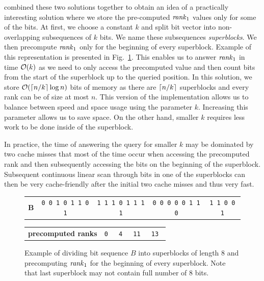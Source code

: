\cite{gonzalez2005practical} combined these two solutions together to obtain an idea of a practically
interesting solution where we store the pre-computed $\mathit{rank}_1$ values only for some
of the bits. At first, we choose a constant $k$ and split bit vector into non-overlapping
subsequences of $k$ bits. We name these subsequences \textit{superblocks}. We then
precompute $\mathit{rank}_1$ only for the beginning of every superblock. Example of this
representation is presented in Fig.~\ref{obr:practicalRank}. This enables us to answer
$\mathit{rank}_1$ in time $\mathcal{O}(k)$ as we need to only access the precomputed value and then count
bits from the start of the superblock up to the queried position. In this solution, we store
$\mathcal{O}(\left\lceil n/k \right\rceil\log n)$ bits of memory as there are $\left\lceil n/k \right\rceil$ superblocks and every rank
can be of size at most $n$. This version of the implementation allows us to balance between
speed and space usage using the parameter $k$. Increasing this parameter allows us to save
space. On the other hand, smaller $k$ requires less work to be done inside of the superblock.

In practice, the time of answering the query for smaller $k$ may be dominated by two cache misses
that most of the time occur when accessing the precomputed rank and then subsequently accessing
the bits on the beginning of the superblock. Subsequent continuous linear scan through bits in
one of the superblocks can then be very cache-friendly after the initial two cache misses and
thus very fast.


\begin{figure}
	\begin{tabular}{c|c|c|c|c|}
	\cline{2-5}
	\textbf{B} & {\tt 0 0 1 0 1 1 0 1} & {\tt 1 1 1 0 1 1 1 1} & {\tt 0 0 0 0 0 1 1 0} & {\tt 1 1 0 0 1} \\ \cline{2-5}
	\end{tabular}

    \bigskip

    \begin{tabular}{c|c|c|c|c|}
        \cline{2-5}
        \textbf{precomputed ranks} & \tt 0 & \tt 4 & \tt 11 & \tt 13 \\ \cline{2-5}
        \end{tabular}

	\caption[TODO]{Example of dividing bit sequence $B$ into superblocks of length 8 and precomputing
    $\mathit{rank}_1$ for the beginning of every superblock. Note that last superblock may not contain full
    number of 8 bits.}
	\label{obr:practicalRank}
\end{figure}

